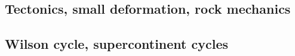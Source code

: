 \cite{dohe01}\cite{reyb01}
\cite{hags03}
\cite{nigm10}
\cite{dyge13}


\subsection*{Tectonics, small deformation, rock mechanics}

\cite{ilma93}
\cite{hept96}
\cite{lega12}

\subsection*{Wilson cycle, supercontinent cycles}

\cite{trry95}
\cite{zhzl07}
\cite{zhzm09}





